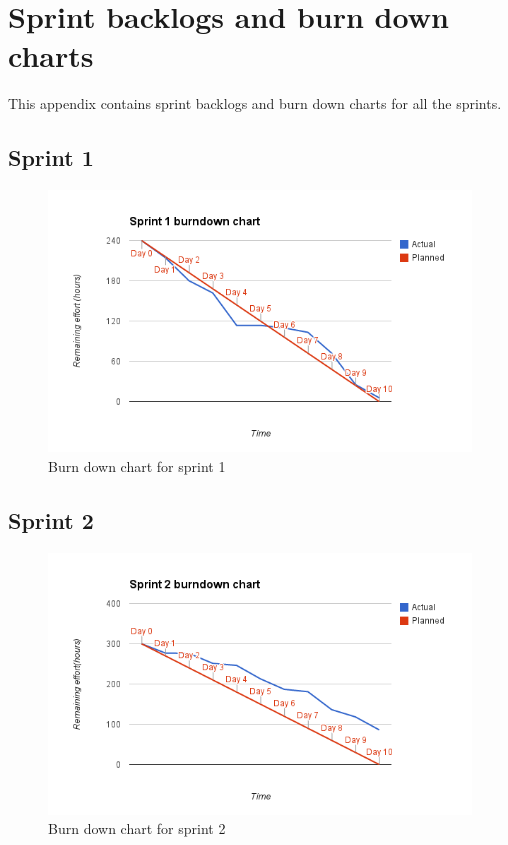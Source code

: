 \chapter{Sprint backlogs and burn down charts}
\label{sec:sprintbacklog}
This appendix contains sprint backlogs and burn down charts for all the sprints.

\section{Sprint 1}
\begin{figure}[H]
\includegraphics[width=\textwidth]{appendix/backlog/burndown1.png}
\caption{Burn down chart for sprint 1}
\end{figure}


\section{Sprint 2}
\begin{figure}[H]
\includegraphics[width=\textwidth]{appendix/backlog/burndown2.png}
\caption{Burn down chart for sprint 2}
\end{figure}


